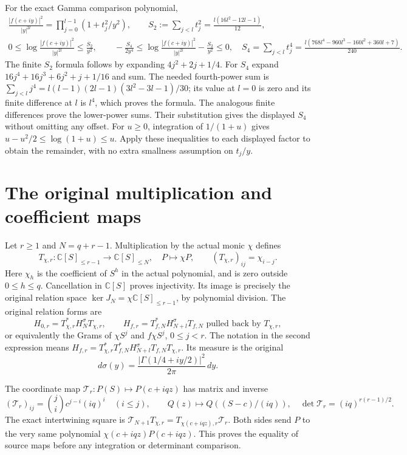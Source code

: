 \documentclass[11pt,a4paper]{article}
\newcommand{\C}{\mathbb C}
\begin{document}
For the exact Gamma comparison polynomial,
\[
\begin{gathered}
 \frac{|f(c+iy)|^2}{|y|^{2l}}
    =\prod_{j=0}^{l-1}(1+t_j^2/y^2),\qquad
 S_2:=\sum_{j<l}t_j^2=\frac{l(16l^2-12l-1)}{12},\\
 0\leq\log\frac{|f(c+iy)|^2}{|y|^{2l}}
        \leq\frac{S_2}{y^2},\qquad
 -\frac{S_4}{2y^4}\leq
 \log\frac{|f(c+iy)|^2}{|y|^{2l}}-\frac{S_2}{y^2}\leq0,
 \quad S_4=\sum_{j<l}t_j^4
 =\frac{l(768l^4-960l^3-160l^2+360l+7)}{240}.
\end{gathered}\tag{BRD8}
\]
The finite $S_2$ formula follows by expanding $4j^2+2j+1/4$.
For $S_4$ expand $16j^4+16j^3+6j^2+j+1/16$ and sum.
The needed fourth-power sum is
$\sum_{j<l}j^4=l(l-1)(2l-1)(3l^2-3l-1)/30$;
its value at $l=0$ is zero and its finite difference at $l$
is $l^4$, which proves the formula. The analogous finite
differences prove the lower-power sums. Their substitution gives
the displayed $S_4$ without omitting any offset.
For $u\geq0$, integration of $1/(1+u)$ gives
$u-u^2/2\leq\log(1+u)\leq u$. Apply these inequalities to
each displayed factor to obtain the remainder, with no extra
smallness assumption on $t_j/y$.

\section{The original multiplication and coefficient maps}

Let $r\geq1$ and $N=q+r-1$. Multiplication by the actual monic
$\chi$ defines
\[
 T_{\chi,r}:\C[S]_{\leq r-1}\longrightarrow\C[S]_{\leq N},
 \quad P\longmapsto\chi P,
 \qquad (T_{\chi,r})_{ij}=\chi_{i-j}.
\tag{BRD9}
\]
Here $\chi_h$ is the coefficient of $S^h$ in the actual polynomial,
and is zero outside $0\leq h\leq q$. Cancellation in $\C[S]$
proves injectivity. Its image is precisely the original relation
space $\ker J_N=\chi\C[S]_{\leq r-1}$, by polynomial division.
The original relation forms are
\[
 H_{0,r}=T_{\chi,r}^*H_N^\sigma T_{\chi,r},\qquad
 H_{f,r}=T_{f,N}^*H_{N+l}^\sigma T_{f,N}
             \text{ pulled back by }T_{\chi,r},
\tag{BRD10}
\]
or equivalently the Grams of $\chi S^j$ and $f\chi S^j$,
$0\leq j<r$. The notation in the second expression means
$H_{f,r}=T_{\chi,r}^*T_{f,N}^*H_{N+l}^\sigma
T_{f,N}T_{\chi,r}$. Its measure is the original
\[
 d\sigma(y)=\frac{|\Gamma(1/4+iy/2)|^2}{2\pi}\,dy.
\tag{BRD11}
\]

The coordinate map $\mathcal T_r:P(S)\mapsto P(c+iqz)$ has
matrix and inverse
\[
 (\mathcal T_r)_{ij}=\binom ji c^{j-i}(iq)^i\quad(i\leq j),
 \qquad Q(z)\longmapsto Q((S-c)/(iq)),
 \quad\det\mathcal T_r=(iq)^{r(r-1)/2}.
\tag{BRD12}
\]
The exact intertwining square is
$\mathcal T_{N+1}T_{\chi,r}=T_{\chi(c+iqz),r}\mathcal T_r$.
Both sides send $P$ to the very same polynomial
$\chi(c+iqz)P(c+iqz)$. This proves the equality of source
maps before any integration or determinant comparison.
\end{document}

